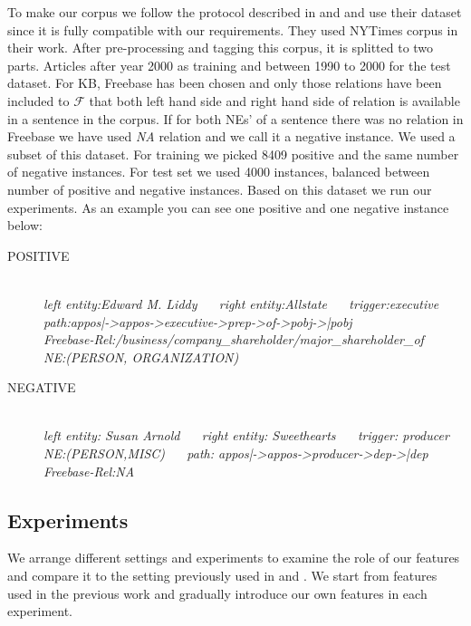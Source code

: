 To make our corpus we follow the protocol described in \cite{Riedel2013} and
\cite{Riedel2010} and use their dataset since it is fully compatible with our
requirements.
They used NYTimes corpus in their work. After pre-processing and tagging this
corpus, it is splitted to two parts. Articles after year 2000 as training and
between 1990 to 2000 for the test dataset. For KB, Freebase has been chosen and
only those relations have been included to $\mathcal{F}$ that both left hand
side and right hand side of relation is available in a sentence in the corpus.
If for both NEs' of a sentence there was no relation in Freebase we have used
\textit{NA} relation and we call it a negative instance. We used a subset of
this dataset.
For training we picked 8409 positive and the same number of negative instances.
For test set we used 4000 instances, balanced between number of positive and
negative instances. Based on this dataset we run our experiments. As an example
you can see one positive and one negative instance below:
\begin{description}
\item[POSITIVE]\hfil \\ \textit{left entity:Edward M. Liddy ~~  right
entity:Allstate ~~ trigger:executive ~~ path:appos|->appos->executive->prep->of->pobj->|pobj
~~ \\ Freebase-Rel:/business/company\_shareholder/major\_shareholder\_of
~~ NE:(PERSON, ORGANIZATION) }
\item[NEGATIVE] \hfil \\ \textit{left entity: Susan Arnold ~~ right entity:
Sweethearts ~~ trigger: producer        NE:(PERSON,MISC)
~~ path: appos|->appos->producer->dep->|dep   ~~    Freebase-Rel:NA}
\end{description}

\subsection{Experiments}
\label{ssec:textkb-exp-exp}


We arrange different settings and experiments to examine the role of our
features and compare it to the setting previously used in \cite{Bordes2011} and
\cite{Bordes2012}. We start from features used in the previous work and
gradually introduce our own features in each experiment.

